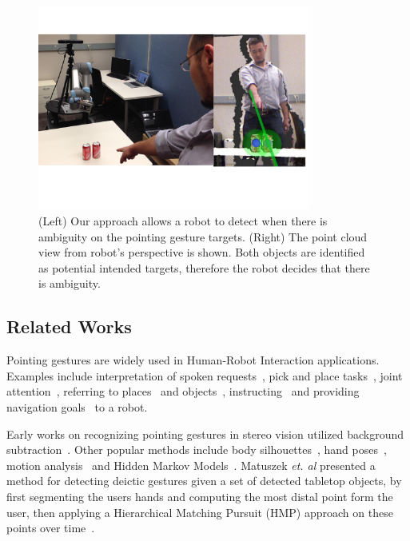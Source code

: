 \begin{figure}[ht!]
\centering
\includegraphics[width=0.8\textwidth]{pics/cover_pointing_gestures}
\caption{(Left) Our approach allows a robot to detect when there is ambiguity on the pointing gesture targets. (Right) The point cloud view from robot's perspective is shown. Both objects are identified as potential intended targets, therefore the robot decides that there is ambiguity.}
\label{fig:cover_pointing_gestures}
\end{figure}



\subsection{Related Works}
\label{sec:pointing_related_works}

Pointing gestures are widely used in Human-Robot Interaction applications. Examples include interpretation of spoken requests~\cite{zukerman2010interpreting}, pick and place tasks~\cite{blodow2011inferring}, joint attention~\cite{droeschel2011towards}, referring to places~\cite{hato2010pointing} and objects~\cite{schmidt2008interacting}, instructing~\cite{martin2010estimation} and providing navigation goals~\cite{raza2013human} to a robot. 

Early works on recognizing pointing gestures in stereo vision utilized background subtraction~\cite{cipolla1996human,jojic2000detection,kahn1995understanding}. Other popular methods include body silhouettes~\cite{kehl2004real}, hand poses~\cite{hu2010hand}, motion analysis~\cite{matikainen2011prop} and Hidden Markov Models~\cite{wilson1999parametric, bennewitz2008robust, li2005hierarchical, nickel2003pointing, droeschel2011learning, aly2012integrated}. Matuszek \emph{et. al} presented a method for detecting deictic gestures given a set of detected tabletop objects, by first segmenting the users hands and computing the most distal point form the user, then applying a Hierarchical Matching Pursuit (HMP) approach on these points over time~\cite{matuszek2014learning}. 

